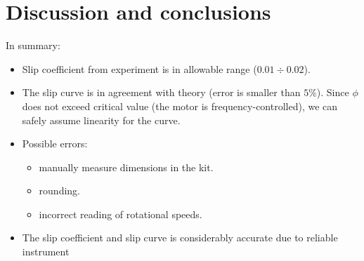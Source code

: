\section{Discussion and conclusions}
In summary:
\begin{itemize}
	\item Slip coefficient from experiment is in allowable range ($ 0.01\div0.02 $).
	\item The slip curve is in agreement with theory (error is smaller than $ 5\% $). Since $ \phi $ does not exceed critical value (the motor is frequency-controlled), we can safely assume linearity for the curve.
	\item Possible errors:
	\begin{itemize}
		\item manually measure dimensions in the kit.
		\item rounding.
		\item incorrect reading of rotational speeds.
	\end{itemize}
	\item The slip coefficient and slip curve is considerably accurate due to reliable instrument
\end{itemize}
